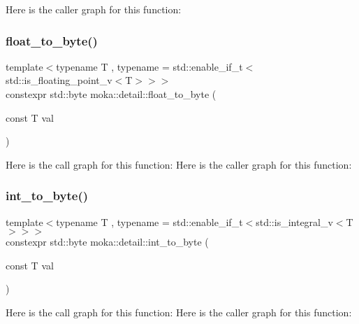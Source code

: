 Here is the caller graph for this function\+:
\mbox{\label{namespacemoka_1_1detail_ae7d7310f93779c41997daa340c988dd9}} 
\subsubsection{\texorpdfstring{float\_to\_byte()}{float\_to\_byte()}}
{\footnotesize\ttfamily template$<$typename T , typename  = std\+::enable\+\_\+if\+\_\+t$<$std\+::is\+\_\+floating\+\_\+point\+\_\+v$<$\+T$>$$>$$>$ \\
constexpr std\+::byte moka\+::detail\+::float\+\_\+to\+\_\+byte (\begin{DoxyParamCaption}\item[{const T}]{val }\end{DoxyParamCaption})\hspace{0.3cm}{\ttfamily [noexcept]}}

Here is the call graph for this function\+:
Here is the caller graph for this function\+:
\mbox{\label{namespacemoka_1_1detail_a366b546068df519a1f4295fe4705d5a8}} 
\subsubsection{\texorpdfstring{int\_to\_byte()}{int\_to\_byte()}}
{\footnotesize\ttfamily template$<$typename T , typename  = std\+::enable\+\_\+if\+\_\+t$<$std\+::is\+\_\+integral\+\_\+v$<$\+T$>$$>$$>$ \\
constexpr std\+::byte moka\+::detail\+::int\+\_\+to\+\_\+byte (\begin{DoxyParamCaption}\item[{const T}]{val }\end{DoxyParamCaption})\hspace{0.3cm}{\ttfamily [noexcept]}}

Here is the call graph for this function\+:
Here is the caller graph for this function\+:

